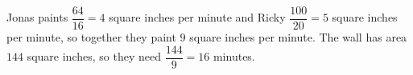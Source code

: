 Jonas paints $\dfrac{64}{16}=4$ square inches per minute and Ricky $\dfrac{100}{20}=5$ square inches per minute, so together they paint $9$ square inches per minute. The wall has area $144$ square inches, so they need $\dfrac{144}{9}=\boxed{16}$ minutes.
